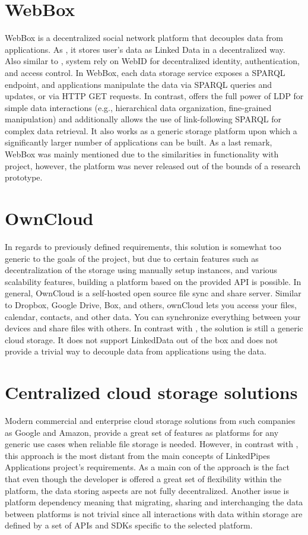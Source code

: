 \section{WebBox}

WebBox is a decentralized social network platform that decouples data from applications. As \solid{}, it stores user’s data as Linked Data in a decentralized way. Also similar to \solid{}, system rely on WebID for decentralized identity, authentication, and access control. In WebBox, each data storage service exposes a SPARQL endpoint, and applications manipulate the data via SPARQL queries and updates, or via HTTP GET requests. In contrast, \solid{} offers the full power of LDP for simple data interactions (e.g., hierarchical data organization, fine-grained manipulation) and additionally allows the use of link-following SPARQL for complex data retrieval. It also works as a generic storage platform upon which a significantly larger number of applications can be built. As a last remark, WebBox was mainly mentioned due to the similarities in functionality with \solid{} project, however, the platform was never released out of the bounds of a research prototype.

\section{OwnCloud}

In regards to previously defined requirements, this solution is somewhat too generic to the goals of the project, but due to certain features such as decentralization of the storage using manually setup instances, and various scalability features, building a platform based on the provided API is possible. In general, OwnCloud is a self-hosted open source file sync and share server. Similar to Dropbox, Google Drive, Box, and others, ownCloud lets you access your files, calendar, contacts, and other data. You can synchronize everything between your devices and share files with others. In contrast with \solid{}, the solution is still a generic cloud storage. It does not support LinkedData out of the box and does not provide a trivial way to decouple data from applications using the data. 

\section{Centralized cloud storage solutions}

Modern commercial and enterprise cloud storage solutions from such companies as Google and Amazon, provide a great set of features as platforms for any generic use cases when reliable file storage is needed. However, in contrast with \solid{}, this approach is the most distant from the main concepts of LinkedPipes Applications project’s requirements. As a main con of the approach is the fact that even though the developer is offered a great set of flexibility within the platform, the data storing aspects are not fully decentralized. Another issue is platform dependency meaning that migrating, sharing and interchanging the data between platforms is not trivial since all interactions with data within storage are defined by a set of APIs and SDKs specific to the selected platform. 